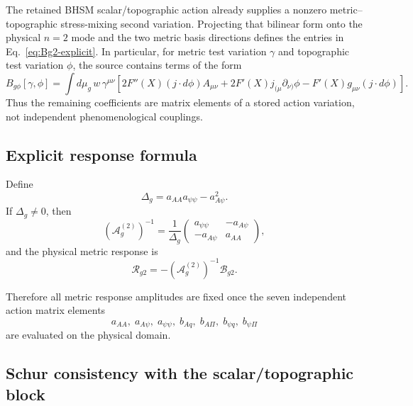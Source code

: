 The retained BHSM scalar/topographic action already supplies a nonzero
metric--topographic stress-mixing second variation.  Projecting that bilinear
form onto the physical $n=2$ mode and the two metric basis directions defines
the entries in Eq.~\eqref{eq:Bg2-explicit}.  In particular, for metric test
variation $\gamma$ and topographic test variation $\phi$, the source contains
terms of the form
\begin{equation}
B_{g\phi}[\gamma,\phi]
=
\int d\mu_g\,w\,\gamma^{\mu\nu}
\left[
2F''(X)(j\!\cdot\!d\phi)A_{\mu\nu}
+
2F'(X)j_{(\mu}\partial_{\nu)}\phi
-
F'(X)g_{\mu\nu}(j\!\cdot\!d\phi)
\right].
\label{eq:metric-topographic-mixed-form}
\end{equation}
Thus the remaining coefficients are matrix elements of a stored action
variation, not independent phenomenological couplings.

\subsection{Explicit response formula}

Define
\begin{equation}
\Delta_g
=
a_{AA}a_{\psi\psi}-a_{A\psi}^2.
\end{equation}
If $\Delta_g\neq0$, then
\begin{equation}
(\mathcal A_g^{(2)})^{-1}
=
\frac1{\Delta_g}
\begin{pmatrix}
a_{\psi\psi} & -a_{A\psi}\\
-a_{A\psi} & a_{AA}
\end{pmatrix},
\end{equation}
and the physical metric response is
\begin{equation}
\boxed{
\mathcal R_{g2}
=
-(\mathcal A_g^{(2)})^{-1}\mathcal B_{g2}.
}
\label{eq:Rg2-explicit}
\end{equation}

Therefore all metric response amplitudes are fixed once the seven independent
action matrix elements
\begin{equation}
\boxed{
a_{AA},\;
a_{A\psi},\;
a_{\psi\psi},\;
b_{Aq},\;
b_{A\Pi},\;
b_{\psi q},\;
b_{\psi\Pi}
}
\label{eq:seven-matrix-elements}
\end{equation}
are evaluated on the physical domain.

\subsection{Schur consistency with the scalar/topographic block}

